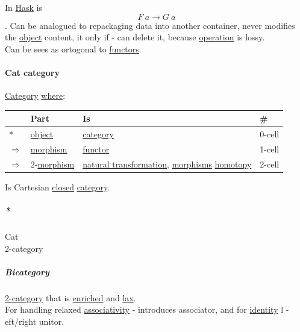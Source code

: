 \documentclass[11pt]{article}
\begin{document}
In \hyperref[org79be162]{Hask} is $$ F \ a \to G \ a $$. Can be analogued to repackaging data into another container, never modifies the \hyperref[org025aac8]{object} content, it only if - can delete it, because \hyperref[org87d485b]{operation} is lossy.\\

Can be sees as ortogonal to \hyperref[org6c3c2a6]{functors}.\\

\paragraph{\label{org955b273}Cat category}
\label{sec:orgac12695}
\hyperref[org3e3a79b]{Category} \hyperref[orgefd1ecd]{where}:\\

\begin{center}
\begin{tabular}{llll}
 & Part & Is & \#\\
\hline
* & \hyperref[org025aac8]{object} & \hyperref[org3e3a79b]{category} & 0-cell\\
\(\Rightarrow\) & \hyperref[orgad99fc6]{morphism} & \hyperref[org6073683]{functor} & 1-cell\\
\(\Rightarrow\) & 2-\hyperref[orgad99fc6]{morphism} & \hyperref[org381dd2b]{natural transformation}, \hyperref[org8ed0ce8]{morphisms} \hyperref[orgc7221e4]{homotopy} & 2-cell\\
\end{tabular}
\end{center}


Is Cartesian \hyperref[orgfa67abb]{closed} \hyperref[org3e3a79b]{category}.\\

\subparagraph{\emph{*}}
\label{sec:org1bb2ee9}
\label{orgbc5a305}Cat\\
\label{org80e6f86}2-category\\

\subparagraph{Bicategory}
\label{sec:org7e42da6}
\hyperref[org80e6f86]{2-category} that is \hyperref[org56a3665]{enriched} and \hyperref[org678d1cb]{lax}.\\

For handling relaxed \hyperref[org8a2c45d]{associativity} - introduces associator, and for \hyperref[org3bbbadd]{identity} l -eft/right unitor.\\
\end{document}
